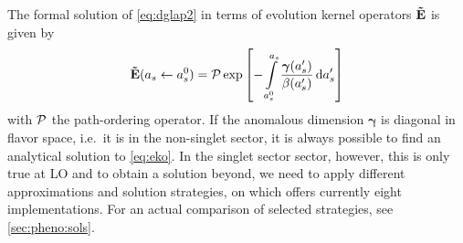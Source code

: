 The formal solution of \cref{eq:dglap2} in terms of evolution kernel operators
$\vb {\tilde E}$ is given by
\begin{equation}
    \vb {\tilde E}(a_s \leftarrow a_s^0)  = \mathcal{P} \exp\qty[-\int\limits_{a_s^0}^{a_s} \frac{\bm{\gamma}(a_s')}{\beta(a_s')} \dd{a_s'} ]
    \label{eq:eko}
\end{equation}
with $\mathcal{P}$ the path-ordering operator. If the anomalous dimension $\bm{\gamma}$ is
diagonal in flavor space, i.e.\ it is in the non-singlet sector, it is always
possible to find an analytical solution to \cref{eq:eko}.  In the singlet
sector sector, however, this is only true at LO and to obtain a solution
beyond, we need to apply different approximations and solution strategies, on
which \eko{} offers currently eight implementations. For an actual comparison
of selected strategies, see \cref{sec:pheno:sols}.
